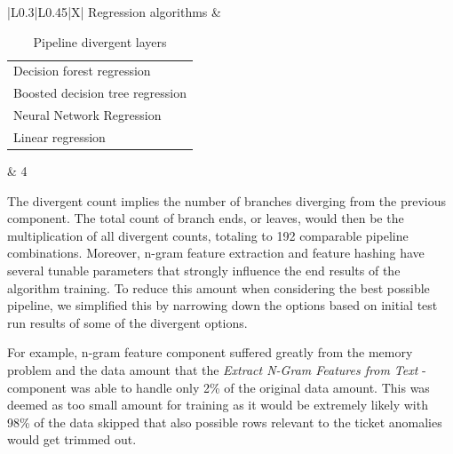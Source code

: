 \begin{table}[]
\begin{tabularx}{\textwidth}{|L{0.3\textwidth}|L{0.45\textwidth}|X|}
        Regression algorithms &
        \begin{tabular}[c]{@{}l@{}}Decision forest regression \\ Boosted decision tree regression \\ Neural Network Regression \\ Linear regression\end{tabular} &
        4 \\ \hline
    \end{tabularx}
    \caption{Pipeline divergent layers}
    \label{tab:ml-pipeline-branching}
\end{table}

The divergent count implies the number of branches
diverging from the previous component.
The total count of branch ends, or leaves,
would then be the multiplication of all divergent counts,
totaling to 192 comparable pipeline combinations.
Moreover,
n-gram feature extraction and feature hashing
have several tunable parameters
that strongly influence the end results of the algorithm training.
To reduce this amount when considering the best possible pipeline,
we simplified this by narrowing down the options
based on initial test run results of some of the divergent options.

For example,
n-gram feature component suffered greatly from the memory problem %
and the data amount that the \textit{Extract N-Gram Features from Text} -component
was able to handle only 2\% of the original data amount.
This was deemed as too small amount for training
as it would be extremely likely with 98\% of the data skipped
that also possible rows relevant to the ticket anomalies
would get trimmed out.





